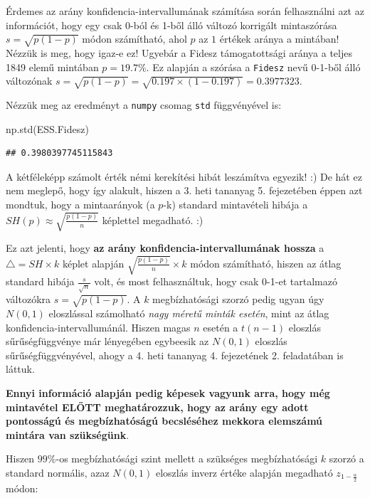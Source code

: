 \documentclass[
]{book}
\newenvironment{Shaded}{\begin{snugshade}}{\end{snugshade}}
\newcommand{\NormalTok}[1]{#1}
\begin{document}
Érdemes az arány konfidencia-intervallumának számítása során felhasználni azt az információt, hogy egy csak 0-ból és 1-ből álló változó korrigált mintaszórása \(s=\sqrt{p(1-p)}\) módon számítható, ahol \(p\) az \(1\) értékek aránya a mintában!
Nézzük is meg, hogy igaz-e ez! Ugyebár a Fidesz támogatottsági aránya a teljes 1849 elemű mintában \(p=19.7\%\). Ez alapján a szórása a \texttt{Fidesz} nevű 0-1-ből álló változónak \(s=\sqrt{p(1-p)}=\sqrt{0.197 \times (1-0.197)}=0.3977323\).

Nézzük meg az eredményt a \texttt{numpy} csomag \texttt{std} függvényével is:

\begin{Shaded}
\begin{Highlighting}[]
\NormalTok{np.std(ESS.Fidesz)}
\end{Highlighting}
\end{Shaded}

\begin{verbatim}
## 0.3980397745115843
\end{verbatim}

A kétféleképp számolt érték némi kerekítési hibát leszámítva egyezik! :) De hát ez nem meglepő, hogy így alakult, hiszen a 3. heti tananyag 5. fejezetében éppen azt mondtuk, hogy a mintaarányok (a \(p\)-k) standard mintavételi hibája a \(SH(p) \approx \sqrt{\frac{p(1-p)}{n}}\) képlettel megadható. :)

Ez azt jelenti, hogy \textbf{az arány konfidencia-intervallumának hossza} a \(\triangle = SH \times k\) képlet alapján \(\sqrt{\frac{p(1-p)}{n}} \times k\) módon számítható, hiszen az átlag standard hibája \(\frac{s}{\sqrt{n}}\) volt, és most felhasználtuk, hogy csak 0-1-et tartalmazó változókra \(s=\sqrt{p(1-p)}\). A \(k\) megbízhatósági szorzó pedig ugyan úgy \(N(0,1)\) eloszlással számolható \emph{nagy méretű minták esetén}, mint az átlag konfidencia-intervallumánál. Hiszen magas \(n\) esetén a \(t(n-1)\) eloszlás sűrűségfüggvénye már lényegében egybeesik az \(N(0,1)\) eloszlás sűrűségfüggvényével, ahogy a 4. heti tananyag 4. fejezetének 2. feladatában is láttuk.

\textbf{Ennyi információ alapján pedig képesek vagyunk arra, hogy még mintavétel ELŐTT meghatározzuk, hogy az arány egy adott pontosságú és megbízhatóságú becsléséhez mekkora elemszámú mintára van szükségünk}.

Hiszen \(99\%\)-os megbízhatósági szint mellett a szükséges megbízhatósági \(k\) szorzó a standard normális, azaz \(N(0,1)\) eloszlás inverz értéke alapján megadható \(z_{1-\frac{\alpha}{2}}\) módon:
\end{document}
